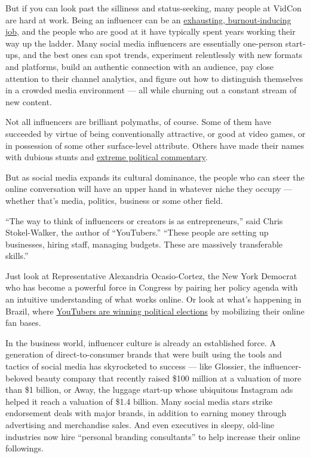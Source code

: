 But if you can look past the silliness and status-seeking, many people
at VidCon are hard at work. Being an influencer can be an
\href{https://www.nytimes.com/2019/07/09/style/emma-chamberlain-youtube.html}{exhausting,
burnout-inducing job}, and the people who are good at it have typically
spent years working their way up the ladder. Many social media
influencers are essentially one-person start-ups, and the best ones can
spot trends, experiment relentlessly with new formats and platforms,
build an authentic connection with an audience, pay close attention to
their channel analytics, and figure out how to distinguish themselves in
a crowded media environment --- all while churning out a constant stream
of new content.

Not all influencers are brilliant polymaths, of course. Some of them
have succeeded by virtue of being conventionally attractive, or good at
video games, or in possession of some other surface-level attribute.
Others have made their names with dubious stunts and
\href{https://www.nytimes.com/interactive/2019/06/08/technology/youtube-radical.html}{extreme
political commentary}.

But as social media expands its cultural dominance, the people who can
steer the online conversation will have an upper hand in whatever niche
they occupy --- whether that's media, politics, business or some other
field.

``The way to think of influencers or creators is as entrepreneurs,''
said Chris Stokel-Walker, the author of ``YouTubers.'' ``These people
are setting up businesses, hiring staff, managing budgets. These are
massively transferable skills.''

Just look at Representative Alexandria Ocasio-Cortez, the New York
Democrat who has become a powerful force in Congress by pairing her
policy agenda with an intuitive understanding of what works online. Or
look at what's happening in Brazil, where
\href{https://www.buzzfeednews.com/article/ryanhatesthis/brazils-congressional-youtubers}{YouTubers
are winning political elections} by mobilizing their online fan bases.

In the business world, influencer culture is already an established
force. A generation of direct-to-consumer brands that were built using
the tools and tactics of social media has skyrocketed to success ---
like Glossier, the influencer-beloved beauty company that recently
raised \$100 million at a valuation of more than \$1 billion, or Away,
the luggage start-up whose ubiquitous Instagram ads helped it reach a
valuation of \$1.4 billion. Many social media stars strike endorsement
deals with major brands, in addition to earning money through
advertising and merchandise sales. And even executives in sleepy,
old-line industries now hire ``personal branding consultants'' to help
increase their online followings.

